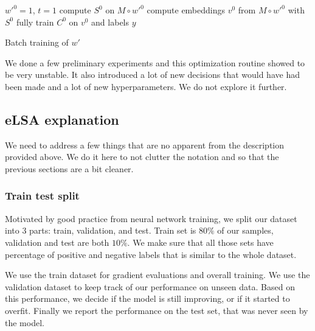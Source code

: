     \begin{algorithm}[H]
        $w'^0 = 1$, $t=1$\;
        compute $S^0$ on $M \circ w'^{0}$\;
        compute embeddings $v^0$ from $M \circ w'^{0}$ with $S^0$\;
        fully train $C^0$ on $v^0$ and labels $y$\;
        
        \caption{Batch training of $w'$} \label{algo:stochastic}
    \end{algorithm}
    
    We done a few preliminary experiments and this optimization routine showed to be very unstable.
    It also introduced a lot of new decisions that would have had been made and a lot of new hyperparameters.
    We do not explore it further.
    
    
    \subsection{eLSA explanation}
    We need to address a few things that are no apparent from the description provided above.
    We do it here to not clutter the notation and so that the previous sections are a bit cleaner. 
    
    \subsubsection{Train test split} \label{sec:train:test:split}
    
    Motivated by good practice from neural network training,
    we split our dataset into $3$ parts: train, validation, and test.
    Train set is $80\%$ of our samples, validation and test are both $10\%$.
    We make sure that all those sets have percentage of positive and negative labels that is similar to the whole dataset.
    
    We use the train dataset for gradient evaluations and overall training. 
    We use the validation dataset to keep track of our performance on unseen data.
    Based on this performance, we decide if the model is still improving, or if it started to overfit.
    Finally we report the performance on the test set, that was never seen by the model.
    
